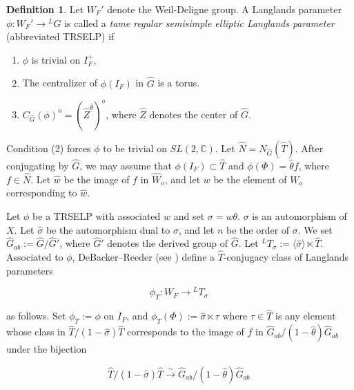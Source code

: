 \documentclass[11pt]{amsart}
\theoremstyle{plain}
\theoremstyle{definition}
\newtheorem{definition}[theorem]{Definition}
\begin{document}
\begin{definition}
  Let $W_F'$ denote the Weil-Deligne group.  A Langlands parameter
  $\phi : W_F' \rightarrow {}^L G$ is called a \emph{tame regular
    semisimple elliptic Langlands parameter} (abbreviated TRSELP) if

  \begin{enumerate}
    \item $\phi$ is trivial on $I_F^+$,

    \item The centralizer of $\phi(I_F)$ in $\hat{G}$ is a torus.

    \item $C_{\hat{G}}(\phi)^o = (\hat{Z}^{\hat{\theta}})^o$, where $\hat{Z}$ denotes the center of $\hat{G}$.
  \end{enumerate}
\end{definition}

Condition (2) forces $\phi$ to be trivial on $SL(2,\mathbb{C})$.  Let
$\hat{N} = N_{\hat{G}}(\hat{T})$.  After conjugating by $\hat{G}$, we
may assume that $\phi(I_F) \subset \hat{T}$ and $\phi(\Phi) = \hat{\theta} f$,
where $f \in \hat{N}$.  Let $\hat{w}$ be the image of $f$ in
$\hat{W}_o$, and let $w$ be the element of $W_o$ corresponding to $\hat{w}$.

Let $\phi$ be a TRSELP with associated $w$ and set $\sigma = w \theta$.
$\sigma$ is an automorphism of $X$.  Let $\hat{\sigma}$ be the
automorphism dual to $\sigma$, and let $n$ be the order of $\sigma$.
We set $\hat{G}_{ab} := \hat{G} / \hat{G}'$, where $\hat{G}'$ denotes
the derived group of $\hat{G}$. Let
${}^L T_{\sigma} := \langle \hat{\sigma} \rangle \ltimes \hat{T}$.
Associated to $\phi$, DeBacker--Reeder (see \cite[Chapter
4]{debackerreeder}) define a $\hat{T}$-conjugacy class of Langlands
parameters

\begin{equation}
\phi_T : W_F \rightarrow {}^L T_{\sigma} \ \label{phiT}
\end{equation}

\noindent as follows.  Set $\phi_T := \phi$ on $I_F$, and
$\phi_T(\Phi) := \hat{\sigma} \ltimes \tau$ where $\tau \in \hat{T}$
is any element whose class in $\hat{T} / (1 - \hat{\sigma}) \hat{T}$
corresponds to the image of $f$ in $\hat{G}_{ab} / (1 - \hat{\theta}) \hat{G}_{ab}$
under the bijection

\begin{equation}
\hat{T} / (1 - \hat{\sigma}) \hat{T} \stackrel{\sim}{\rightarrow} \hat{G}_{ab} / (1 - \hat{\theta}) \hat{G}_{ab} \ \label{bijectionfortau}
\end{equation}
\end{document}
